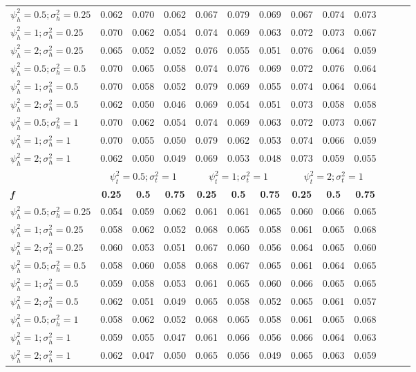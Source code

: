 \begin{table}[ht]
{\begin{tabular}{l c c c c c c c c c c c c}
\hline
$\psi_h^2 = 0.5; \sigma_h^2 = 0.25$ & 0.062 & 0.070 & 0.062 & 0.067 & 0.079 & 0.069 & 0.067 & 0.074 & 0.073 \\
$\psi_h^2 = 1; \sigma_h^2 = 0.25$ & 0.070 & 0.062 & 0.054 & 0.074 & 0.069 & 0.063 & 0.072 & 0.073 & 0.067 \\
$\psi_h^2 = 2; \sigma_h^2 = 0.25$ & 0.065 & 0.052 & 0.052 & 0.076 & 0.055 & 0.051 & 0.076 & 0.064 & 0.059 \\
$\psi_h^2 = 0.5; \sigma_h^2 = 0.5$ & 0.070 & 0.065 & 0.058 & 0.074 & 0.076 & 0.069 & 0.072 & 0.076 & 0.064 \\
$\psi_h^2 = 1; \sigma_h^2 = 0.5$ & 0.070 & 0.058 & 0.052 & 0.079 & 0.069 & 0.055 & 0.074 & 0.064 & 0.064 \\
$\psi_h^2 = 2; \sigma_h^2 = 0.5$ & 0.062 & 0.050 & 0.046 & 0.069 & 0.054 & 0.051 & 0.073 & 0.058 & 0.058 \\
$\psi_h^2 = 0.5; \sigma_h^2 = 1$ & 0.070 & 0.062 & 0.054 & 0.074 & 0.069 & 0.063 & 0.072 & 0.073 & 0.067 \\
$\psi_h^2 = 1; \sigma_h^2 = 1$ & 0.070 & 0.055 & 0.050 & 0.079 & 0.062 & 0.053 & 0.074 & 0.066 & 0.059 \\
$\psi_h^2 = 2; \sigma_h^2 = 1$ & 0.062 & 0.050 & 0.049 & 0.069 & 0.053 & 0.048 & 0.073 & 0.059 & 0.055 \\
\hline 
 & \multicolumn{3}{c}{$\psi_t^2 = 0.5; \sigma_t^2 = 1$} & \multicolumn{3}{c}{$\psi_t^2 = 1; \sigma_t^2 = 1$} & \multicolumn{3}{c}{$\psi_t^2 = 2; \sigma_t^2 = 1$} \\
\addlinespace[1pt]
\cmidrule(lr){2-4} \cmidrule(lr){5-7} \cmidrule(lr){8-10}
\textbf{\textit{f}} & \textbf{0.25} & \textbf{0.5} & \textbf{0.75} & \textbf{0.25} & \textbf{0.5} & \textbf{0.75} & \textbf{0.25} & \textbf{0.5} & \textbf{0.75} \\
\hline
$\psi_h^2 = 0.5; \sigma_h^2 = 0.25$ & 0.054 & 0.059 & 0.062 & 0.061 & 0.061 & 0.065 & 0.060 & 0.066 & 0.065 \\
$\psi_h^2 = 1; \sigma_h^2 = 0.25$ & 0.058 & 0.062 & 0.052 & 0.068 & 0.065 & 0.058 & 0.061 & 0.065 & 0.068 \\
$\psi_h^2 = 2; \sigma_h^2 = 0.25$ & 0.060 & 0.053 & 0.051 & 0.067 & 0.060 & 0.056 & 0.064 & 0.065 & 0.060 \\
$\psi_h^2 = 0.5; \sigma_h^2 = 0.5$ & 0.058 & 0.060 & 0.058 & 0.068 & 0.067 & 0.065 & 0.061 & 0.064 & 0.065 \\
$\psi_h^2 = 1; \sigma_h^2 = 0.5$ & 0.059 & 0.058 & 0.053 & 0.061 & 0.065 & 0.060 & 0.066 & 0.065 & 0.065 \\
$\psi_h^2 = 2; \sigma_h^2 = 0.5$ & 0.062 & 0.051 & 0.049 & 0.065 & 0.058 & 0.052 & 0.065 & 0.061 & 0.057 \\
$\psi_h^2 = 0.5; \sigma_h^2 = 1$ & 0.058 & 0.062 & 0.052 & 0.068 & 0.065 & 0.058 & 0.061 & 0.065 & 0.068 \\
$\psi_h^2 = 1; \sigma_h^2 = 1$ & 0.059 & 0.055 & 0.047 & 0.061 & 0.066 & 0.056 & 0.066 & 0.064 & 0.063 \\
$\psi_h^2 = 2; \sigma_h^2 = 1$ & 0.062 & 0.047 & 0.050 & 0.065 & 0.056 & 0.049 & 0.065 & 0.063 & 0.059 \\
\bottomrule
\end{tabular}}
\end{table}

